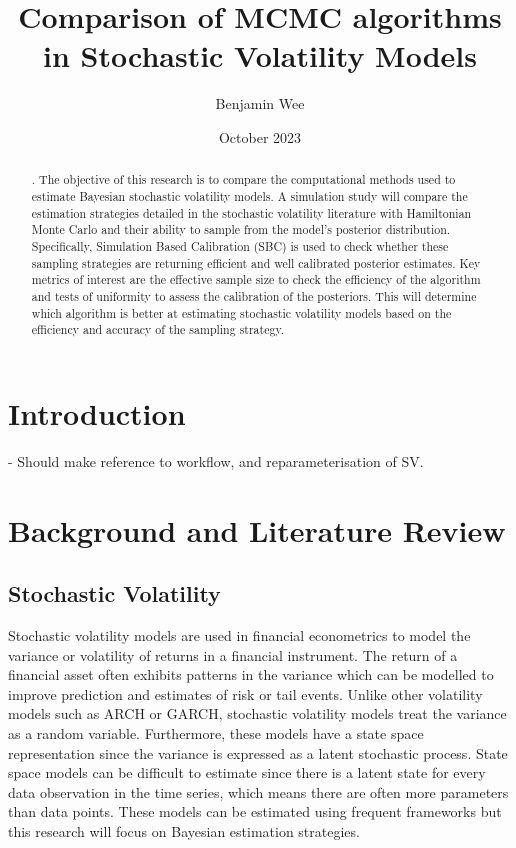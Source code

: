 \documentclass[12pt, a4paper]{article}
\title{Comparison of MCMC algorithms in Stochastic Volatility Models}
\author{Benjamin Wee}
\date{October 2023}
\begin{document}
\maketitle 

\begin{abstract}.  
    The objective of this research is to compare the computational methods used to estimate Bayesian stochastic volatility models. A simulation study will compare the estimation strategies detailed in the stochastic volatility literature with Hamiltonian Monte Carlo and their ability to sample from the model's posterior distribution. Specifically, Simulation Based Calibration (SBC) is used to check whether these sampling strategies are returning efficient and well calibrated posterior estimates. Key metrics of interest are the effective sample size to check the efficiency of the algorithm and tests of uniformity to assess the calibration of the posteriors. This will determine which algorithm is better at estimating stochastic volatility models based on the efficiency and accuracy of the sampling strategy.
\end{abstract}

\newpage

\tableofcontents{\protect\newpage}

\section{Introduction}

- Should make reference to workflow, and reparameterisation of SV.

\section{Background and Literature Review}

    \subsection{Stochastic Volatility}
        Stochastic volatility models are used in financial econometrics to model the variance or volatility of returns in a financial instrument. The return of a financial asset often exhibits patterns in the variance which can be modelled to improve prediction and estimates of risk or tail events. Unlike other volatility models such as ARCH or GARCH, stochastic volatility models treat the variance as a random variable. Furthermore, these models have a state space representation since the variance is expressed as a latent stochastic process. State space models can be difficult to estimate since there is a latent state for every data observation in the time series, which means there are often more parameters than data points. These models can be estimated using frequent frameworks but this research will focus on Bayesian estimation strategies.
\end{document}
